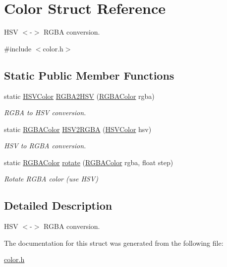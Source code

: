 \hypertarget{struct_color}{}\section{Color Struct Reference}
\label{struct_color}


H\+SV $<$-\/$>$ R\+G\+BA conversion.  




{\ttfamily \#include $<$color.\+h$>$}

\subsection*{Static Public Member Functions}
\begin{DoxyCompactItemize}
\item 
\mbox{\label{struct_color_a484629034430390400f931b8d717a449}} 
static \hyperlink{struct_h_s_v_color}{H\+S\+V\+Color} \hyperlink{struct_color_a484629034430390400f931b8d717a449}{R\+G\+B\+A2\+H\+SV} (\hyperlink{struct_r_g_b_a_color}{R\+G\+B\+A\+Color} rgba)
\begin{DoxyCompactList}\small\item\em R\+G\+BA to H\+SV conversion. \end{DoxyCompactList}\item 
\mbox{\label{struct_color_a960f7c7dc1d48206b0ebdaa43e344c5b}} 
static \hyperlink{struct_r_g_b_a_color}{R\+G\+B\+A\+Color} \hyperlink{struct_color_a960f7c7dc1d48206b0ebdaa43e344c5b}{H\+S\+V2\+R\+G\+BA} (\hyperlink{struct_h_s_v_color}{H\+S\+V\+Color} hsv)
\begin{DoxyCompactList}\small\item\em H\+SV to R\+G\+BA conversion. \end{DoxyCompactList}\item 
\mbox{\label{struct_color_a6148d1ed155d9efc9533e579bbbbe85d}} 
static \hyperlink{struct_r_g_b_a_color}{R\+G\+B\+A\+Color} \hyperlink{struct_color_a6148d1ed155d9efc9533e579bbbbe85d}{rotate} (\hyperlink{struct_r_g_b_a_color}{R\+G\+B\+A\+Color} rgba, float step)
\begin{DoxyCompactList}\small\item\em Rotate R\+G\+BA color (use H\+SV) \end{DoxyCompactList}\end{DoxyCompactItemize}


\subsection{Detailed Description}
H\+SV $<$-\/$>$ R\+G\+BA conversion. 

The documentation for this struct was generated from the following file\+:\begin{DoxyCompactItemize}
\item 
\hyperlink{color_8h}{color.\+h}\end{DoxyCompactItemize}
